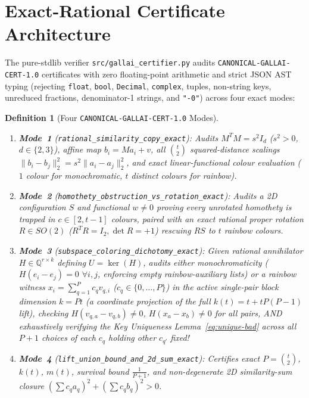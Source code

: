 \documentclass[11pt,twocolumn]{article}
\newtheorem{definition}{Definition}
\newcommand{\QQ}{\mathbb{Q}}
\begin{document}
\section{Exact-Rational Certificate Architecture}\label{sec:certifier}
The pure-stdlib verifier \texttt{src/gallai\_certifier.py} audits \texttt{CANONICAL-GALLAI-CERT-1.0} certificates with zero floating-point arithmetic and strict JSON AST typing (rejecting \texttt{float}, \texttt{bool}, \texttt{Decimal}, \texttt{complex}, tuples, non-string keys, unreduced fractions, denominator-1 strings, and \texttt{"-0"}) across four exact modes:

\begin{definition}[Four \texttt{CANONICAL-GALLAI-CERT-1.0} Modes]\label{def:modes}
\leavevmode
\begin{enumerate}[leftmargin=*,nosep]
  \item \textbf{Mode~1} (\texttt{\small rational\_\allowbreak similarity\_\allowbreak copy\_\allowbreak exact}): Audits $M^T M = s^2 I_d$ ($s^2 > 0$, $d \in \{2,3\}$), affine map $b_i = M a_i + v$, all $\binom{t}{2}$ squared-distance scalings $\|b_i - b_j\|_2^2 = s^2 \|a_i - a_j\|_2^2$, and exact linear-functional colour evaluation ($1$ colour for monochromatic, $t$ distinct colours for rainbow).
  \item \textbf{Mode~2} (\texttt{\small homothety\_\allowbreak obstruction\_\allowbreak vs\_\allowbreak rotation\_\allowbreak exact}): Audits a 2D configuration $S$ and functional $w \neq 0$ proving every unrotated homothety is trapped in $c \in [2, t-1]$ colours, paired with an exact rational proper rotation $R \in SO(2)$ ($R^T R = I_2, \det R = +1$) rescuing $R S$ to $t$ rainbow colours.
  \item \textbf{Mode~3} (\texttt{\small subspace\_\allowbreak coloring\_\allowbreak dichotomy\_\allowbreak exact}): Given rational annihilator $H \in \QQ^{r \times k}$ defining $U = \ker(H)$, audits either monochromaticity ($H(e_i - e_j) = 0$ $\forall i, j$, enforcing empty rainbow-auxiliary lists) or a rainbow witness $x_i = \sum_{q=1}^P c_q v_{q,i}$ ($c_q \in \{0,\dots,P\}$) in the active single-pair block dimension $k = P t$ (a coordinate projection of the full $k(t) = t + tP(P-1)$ lift), checking $H(v_{q,a}-v_{q,b}) \neq 0$, $H(x_a-x_b) \neq 0$ for all pairs, AND exhaustively verifying the Key Uniqueness Lemma~\eqref{eq:unique-bad} across all $P + 1$ choices of each $c_q$ holding other $c_{q'}$ fixed!
  \item \textbf{Mode~4} (\texttt{\small lift\_\allowbreak union\_\allowbreak bound\_\allowbreak and\_\allowbreak 2d\_\allowbreak sum\_\allowbreak exact}): Certifies exact $P = \binom{t}{2}$, $k(t)$, $m(t)$, survival bound $\frac{1}{P+1}$, and non-degenerate 2D similarity-sum closure $(\sum c_q a_q)^2 + (\sum c_q b_q)^2 > 0$.
\end{enumerate}
\end{definition}
\end{document}
